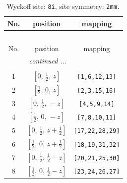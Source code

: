\documentclass[fleqn,8pt]{jsarticle}
\begin{document}
\renewcommand{\arraystretch}{1.2}
\begin{longtable}{ccc}
\caption{Wyckoff site: {\tt 8i}, site symmetry: {\tt 2mm.}}
 \\
 \hline \hline
No. & position & mapping \\ \hline \endfirsthead

\multicolumn{2}{l}{\tablename\ \thetable{}} \\
 \hline \hline
No. & position & mapping \\ \hline \endhead

 \hline \hline
\multicolumn{2}{r}{\footnotesize\it continued ...} \\ \endfoot

 \hline \hline
\multicolumn{2}{r}{} \\ \endlastfoot

1 & $\left[ 0,\, \frac{1}{2},\, z \right]$ & {\tt [1,6,12,13]} \\ \hline
2 & $\left[ \frac{1}{2},\, 0,\, z \right]$ & {\tt [2,3,15,16]} \\ \hline
3 & $\left[ 0,\, \frac{1}{2},\, - z \right]$ & {\tt [4,5,9,14]} \\ \hline
4 & $\left[ \frac{1}{2},\, 0,\, - z \right]$ & {\tt [7,8,10,11]} \\ \hline
5 & $\left[ 0,\, \frac{1}{2},\, z + \frac{1}{2} \right]$ & {\tt [17,22,28,29]} \\ \hline
6 & $\left[ \frac{1}{2},\, 0,\, z + \frac{1}{2} \right]$ & {\tt [18,19,31,32]} \\ \hline
7 & $\left[ 0,\, \frac{1}{2},\, \frac{1}{2} - z \right]$ & {\tt [20,21,25,30]} \\ \hline
8 & $\left[ \frac{1}{2},\, 0,\, \frac{1}{2} - z \right]$ & {\tt [23,24,26,27]} \\
\end{longtable}
\renewcommand{\arraystretch}{1.2}
\end{document}
